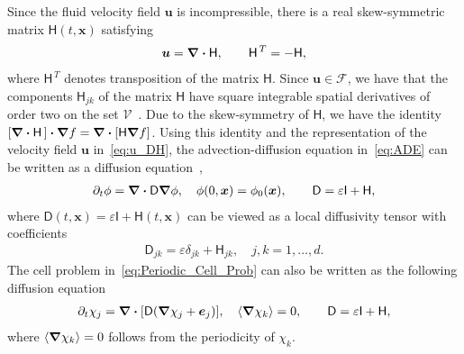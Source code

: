 \documentclass[leqno,onefignum,onetabnum]{siamltex1213}
\newcommand{\Vc}{\mathcal{V}}
\newcommand{\Fc}{\mathcal{F}}
\newcommand{\Dm}{\mathsf{D}}
\newcommand{\Hm}{\mathsf{H}}
\newcommand{\Ib}{\mathsf{I}}
\newcommand\bnabla{\mbox{\boldmath${\nabla}$}}
\providecommand\bcdot{\boldsymbol{\cdot}}
\newcommand{\vecx}{\boldsymbol{x}}
\newcommand{\vecu}{\boldsymbol{u}}
\newcommand{\vece}{\boldsymbol{e}}
\begin{document}
Since the fluid velocity field $\vecu$ is incompressible, there is a
real skew-symmetric matrix $\Hm(t,\vecx)$
satisfying~\cite{Avellaneda:PRL-753,Avellaneda:CMP-339}   
% 
\begin{align}\label{eq:u_DH}
 \vecu =\bnabla \bcdot\Hm, \qquad   \Hm^{\,T}=-\Hm,
\end{align}
% 
where $\Hm^{\,T}$ denotes transposition of the matrix $\Hm$. Since
$\vecu\in\Fc$, we have that the components $\Hm_{jk}$ of the matrix
$\Hm$ have square integrable spatial derivatives of order two on the
set $\Vc$~\cite{Bhattacharya:AAP:1999:951}. Due to 
the skew-symmetry of $\Hm$, we have the identity
$[\bnabla\bcdot\Hm\,]\bcdot\bnabla f=\bnabla\bcdot[\Hm\bnabla f]$. Using
this identity and the representation of the velocity field $\vecu$
in~\eqref{eq:u_DH}, the advection-diffusion equation in~\eqref{eq:ADE}
can be written as a diffusion
equation~\cite{Fannjiang:1994:SIAM_JAM:333},    
%
\begin{align}\label{eq:ADE_Divergence}
  \partial_t\phi%
    =\bnabla \bcdot\Dm\bnabla \phi, \quad
    \phi(0,\vecx)=\phi_0(\vecx),
    \qquad
    \Dm=\varepsilon\Ib+\Hm,
\end{align}
%
where $\Dm(t,\vecx)=\varepsilon\Ib+\Hm(t,\vecx)$ can be viewed as a local
diffusivity tensor with coefficients
%
\begin{align}\label{eq:kappa_coeff}
  \Dm_{jk}=\varepsilon\delta_{jk}+\Hm_{jk},\quad j,k=1,\ldots,d.
\end{align}
%
The cell problem in~\eqref{eq:Periodic_Cell_Prob} can also be
written as the following diffusion
equation~\cite{Fannjiang:1994:SIAM_JAM:333}     
% 
\begin{align}\label{eq:Cell_Problem_Hm}
  \partial_t\chi_j=\bnabla \bcdot[\Dm(\bnabla \chi_j+\vece_j)],
  \quad
  \langle\bnabla \chi_k\rangle=0, \qquad
  \Dm=\varepsilon\Ib+\Hm,
\end{align}
%
where $\langle\bnabla \chi_k\rangle=0$ follows from the periodicity of $\chi_k$.
\end{document}
